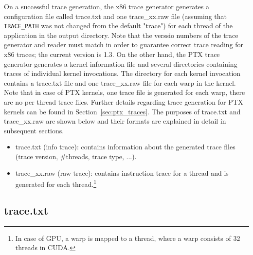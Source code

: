 On a successful trace generation, the x86 trace generator generates a
configuration file called trace.txt and one trace\_xx.raw file
(assuming that \Verb+TRACE_PATH+ was not changed from the default "trace") for each thread
of the application in the output directory. Note that the verssio numbers
of the trace generator and reader must match in order to guarantee correct
trace reading for x86 traces; the current version is 1.3. On the other hand, the PTX
trace generator generates a kernel information file and several
directories containing traces of individual kernel invocations. The
directory for each kernel invocation contains a trace.txt file and one
trace\_xx.raw file for each warp in the kernel.  Note that in case of
PTX kernels, one trace file is generated for each warp, there are no
per thread trace files. Further details regarding trace generation for
PTX kernels can be found in Section~\ref{sec:ptx_traces}. The purposes
of trace.txt and trace\_xx.raw are shown below and their formats are
explained in detail in subsequent sections.


\begin{itemize}\itemsep2pt
\item trace.txt (info trace): contains information about the generated
  trace files (trace version, \#threads, trace type, ...).

\item trace\_xx.raw (raw trace): contains instruction trace for a
  thread and is generated for each thread.\footnote{In case of GPU, a
    warp is mapped to a \SIM thread, where a warp consists of 32
    threads in CUDA.}
\end{itemize}



\subsection{trace.txt}


